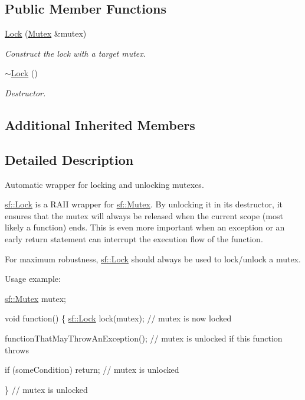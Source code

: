 \subsection*{Public Member Functions}
\begin{DoxyCompactItemize}
\item 
\hyperlink{classsf_1_1_lock_a1a4c5d7a15da61103d85c9aa7f118920}{Lock} (\hyperlink{classsf_1_1_mutex}{Mutex} \&mutex)
\begin{DoxyCompactList}\small\item\em Construct the lock with a target mutex. \end{DoxyCompactList}\item 
\hyperlink{classsf_1_1_lock_a8168b36323a18ccf5b6bc531d964aec5}{$\sim$\-Lock} ()
\begin{DoxyCompactList}\small\item\em Destructor. \end{DoxyCompactList}\end{DoxyCompactItemize}
\subsection*{Additional Inherited Members}


\subsection{Detailed Description}
Automatic wrapper for locking and unlocking mutexes. 

\hyperlink{classsf_1_1_lock}{sf\-::\-Lock} is a R\-A\-I\-I wrapper for \hyperlink{classsf_1_1_mutex}{sf\-::\-Mutex}. By unlocking it in its destructor, it ensures that the mutex will always be released when the current scope (most likely a function) ends. This is even more important when an exception or an early return statement can interrupt the execution flow of the function.

For maximum robustness, \hyperlink{classsf_1_1_lock}{sf\-::\-Lock} should always be used to lock/unlock a mutex.

Usage example\-: 
\begin{DoxyCode}
\hyperlink{classsf_1_1_mutex}{sf::Mutex} mutex;

\textcolor{keywordtype}{void} \textcolor{keyword}{function}()
\{
    \hyperlink{classsf_1_1_lock}{sf::Lock} lock(mutex); \textcolor{comment}{// mutex is now locked}

    functionThatMayThrowAnException(); \textcolor{comment}{// mutex is unlocked if this function throws}

    \textcolor{keywordflow}{if} (someCondition)
        \textcolor{keywordflow}{return}; \textcolor{comment}{// mutex is unlocked}

\} \textcolor{comment}{// mutex is unlocked}
\end{DoxyCode}



